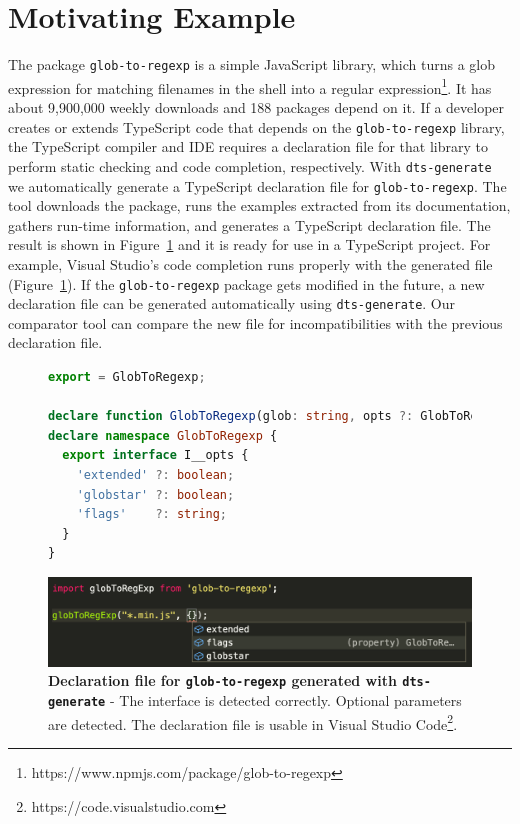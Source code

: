 \documentclass[english,cleveref,autoref,submission]{programming}
\newcommand{\figref}[1]{Figure~\ref{#1}}
\begin{document}
\section{Motivating Example}
\label{sec:motivating-example}
The \NPM{} package \texttt{glob-to-regexp} is a simple JavaScript library, which turns a
glob expression for matching filenames in the shell into a regular
expression\footnote{https://www.npmjs.com/package/glob-to-regexp}. It 
has about 9,900,000 weekly downloads and 188 \NPM{} packages depend on it. If
a developer creates or extends TypeScript code that depends on the
\texttt{glob-to-regexp} library, the TypeScript
compiler and IDE requires a declaration file for that library to
perform static checking and code completion, respectively. With
\texttt{dts-generate} we automatically generate a TypeScript
declaration file for \texttt{glob-to-regexp}. The tool downloads the \NPM{} 
package, runs the examples extracted from its documentation, gathers
run-time information, and generates a TypeScript declaration
file. The result is 
shown in \figref{fig:motivating-example-glob-to-regexp-vscode} and it is
ready for use in a TypeScript project. For example,  Visual Studio's
code completion runs properly with the generated file
(\figref{fig:motivating-example-glob-to-regexp-vscode}). If the
\texttt{glob-to-regexp} package gets modified in the future, a new declaration
file can be generated automatically using
\texttt{dts-generate}. Our comparator tool can compare the new file
for incompatibilities with the previous declaration file.

\begin{figure}[tp]
  \centering
    \begin{lstlisting}[language=TypeScript,numbers=none]
export = GlobToRegexp;

declare function GlobToRegexp(glob: string, opts ?: GlobToRegexp.I__opts): RegExp;
declare namespace GlobToRegexp {
  export interface I__opts {
    'extended' ?: boolean;
    'globstar' ?: boolean;
    'flags'    ?: string;
  }
}
    \end{lstlisting}
  \begin{center}
    \includegraphics[width=0.8\linewidth]{motivating-example-glob-to-regexp-vscode.png}
  \end{center}

  \caption{\textbf{Declaration file for \texttt{glob-to-regexp}
      generated with \texttt{dts-generate}} - The interface is
    detected correctly. Optional parameters are detected. The
    declaration file is usable in Visual Studio
    Code\footnote{https://code.visualstudio.com}.} 
  \label{fig:motivating-example-glob-to-regexp-vscode}
\end{figure}
\end{document}
